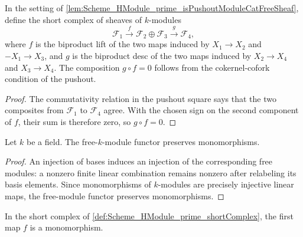 \begin{definition}\leanok
  \label{def:Scheme_HModule_prime_shortComplex}

  In the setting of \cref{lem:Scheme_HModule_prime_isPushoutModuleCatFreeSheaf}, define the short complex of sheaves of \(k\)-modules
  \[
    \mathcal F_1 \xrightarrow{\;f\;} \mathcal F_2 \oplus \mathcal F_3 \xrightarrow{\;g\;} \mathcal F_4,
  \]
  where \(f\) is the biproduct lift of the two maps induced by \(X_1 \to X_2\) and \(-X_1 \to X_3\), and \(g\) is the biproduct desc of the two maps induced by \(X_2 \to X_4\) and \(X_3 \to X_4\). The composition \(g \circ f = 0\) follows from the cokernel-cofork condition of the pushout.
\end{definition}

\begin{proof}

  \leanok
  The commutativity relation in the pushout square says that the two composites from \(\mathcal F_1\) to \(\mathcal F_4\) agree. With the chosen sign on the second component of \(f\), their sum is therefore zero, so \(g\circ f=0\).
\end{proof}

\begin{definition}\leanok
  \label{def:Scheme_ModuleCat_free_preservesMonomorphisms}
  Let \(k\) be a field. The free-\(k\)-module functor preserves monomorphisms.
\end{definition}

\begin{proof}
  \leanok
  An injection of bases induces an injection of the corresponding free modules: a nonzero finite linear combination remains nonzero after relabeling its basis elements. Since monomorphisms of \(k\)-modules are precisely injective linear maps, the free-module functor preserves monomorphisms.
\end{proof}

\begin{lemma}\leanok
  \label{lem:Scheme_HModule_prime_shortComplex_f_mono}

  In the short complex of \cref{def:Scheme_HModule_prime_shortComplex}, the first map \(f\) is a monomorphism.
\end{lemma}

